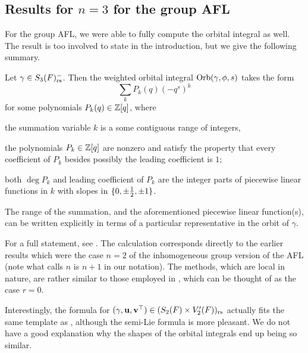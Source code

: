 \subsection{Results for $n=3$ for the group AFL}
\label{sec:results_group_AFL}
For the group AFL, we were able to fully compute the orbital integral as well.
The result is too involved to state in the introduction,
but we give the following summary.
\begin{theorem}
  \label{thm:summary}
  Let $\gamma \in S_3(F)_{\mathrm{rs}}^-$.
  Then the weighted orbital integral $\operatorname{Orb}(\gamma, \phi, s)$ takes the form
  \[ \sum_k P_k(q) (-q^s)^k \]
  for some polynomials $P_k(q) \in \mathbb Z[q]$, where
  \begin{itemize}
    \ii the summation variable $k$ is a some contiguous range of integers,

    \ii the polynomials $P_k \in \mathbb Z[q]$ are nonzero and satisfy the property
    that every coefficient of $P_k$ besides possibly the leading coefficient is $1$;

    \ii both $\deg P_k$ and leading coefficient of $P_k$ are the integer parts
    of piecewise linear functions in $k$ with slopes in $\{0, \pm\frac{1}{2}, \pm 1\}$.
  \end{itemize}
  The range of the summation, and the aforementioned piecewise linear function(s),
  can be written explicitly in terms of a particular representative
  in the orbit of $\gamma$.
\end{theorem}
For a full statement, see
.
The calculation corresponds directly to the earlier results
\cite[Lemma 7.1.1 and Proposition 7.3.2]{ref:AFLspherical}
which were the case $n = 2$ of the inhomogeneous group version of the AFL
(note what \cite{ref:AFLspherical} calls $n$ is $n+1$ in our notation).
The methods, which are local in nature,
are rather similar to those employed in \cite{ref:AFL},
which can be thought of as the case $r = 0$.

\begin{remark}
  Interestingly, the formula 
  for ${(\gamma, \mathbf u, \mathbf v^\top)} \in (S_2(F) \times V'_2(F))_{\mathrm{rs}}$
  actually fits the same template as ,
  although the semi-Lie formula is more pleasant.
  We do not have a good explanation why the shapes of the orbital integrals
  end up being so similar.
\end{remark}

